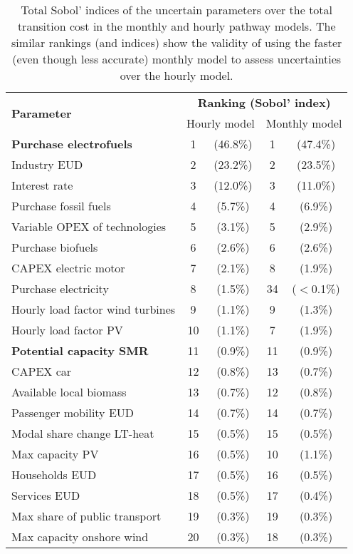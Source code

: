 \begin{table}[htbp!]
\caption{Total Sobol' indices of the uncertain parameters over the total transition cost in the monthly and hourly pathway models. The similar rankings (and indices) show the validity of using the faster (even though less accurate) monthly model to assess uncertainties over the hourly model.}
\label{tab:UQ_full}
\centering
\begin{tabular}{l c c|c c}
\toprule
\multirow{2}{*}{\textbf{Parameter}}  & \multicolumn{4}{c}{\textbf{Ranking (Sobol' index)}}\\
& \multicolumn{2}{c|}{Hourly model} & \multicolumn{2}{c}{Monthly model}\\ 	
\midrule
\textbf{Purchase electrofuels} & 1 & (46.8\%) & 1 & (47.4\%) \\
Industry EUD & 2 & (23.2\%) & 2 & (23.5\%) \\
Interest rate & 3 & (12.0\%) & 3 & (11.0\%) \\
Purchase fossil fuels & 4 & (5.7\%) & 4 & (6.9\%) \\
\midrule
Variable OPEX of technologies & 5 & (3.1\%) & 5 & (2.9\%)\\
Purchase biofuels & 6 & (2.6\%) & 6 & (2.6\%) \\
CAPEX electric motor & 7 & (2.1\%) & 8 & (1.9\%) \\
Purchase electricity & 8 & (1.5\%) & 34 & ($<$0.1\%) \\
Hourly load factor wind turbines & 9 & (1.1\%) & 9 & (1.3\%)\\
Hourly load factor PV & 10 & (1.1\%) & 7 & (1.9\%) \\
\textbf{Potential capacity \gls{SMR}} & 11 & (0.9\%) & 11 & (0.9\%)\\
CAPEX car & 12 & (0.8\%) & 13 & (0.7\%) \\
Available local biomass & 13 & (0.7\%) & 12 & (0.8\%) \\
Passenger mobility EUD & 14 & (0.7\%) & 14 & (0.7\%) \\
Modal share change LT-heat & 15 & (0.5\%) & 15 & (0.5\%)\\
Max capacity PV & 16 & (0.5\%) & 10 & (1.1\%)\\
Households EUD & 17 & (0.5\%) & 16 & (0.5\%) \\
Services EUD & 18 & (0.5\%) &  17 & (0.4\%) \\
Max share of public transport & 19 & (0.3\%) & 19 & (0.3\%) \\
Max capacity onshore wind & 20 & (0.3\%) & 18 & (0.3\%) \\

\end{tabular}
\end{table}
